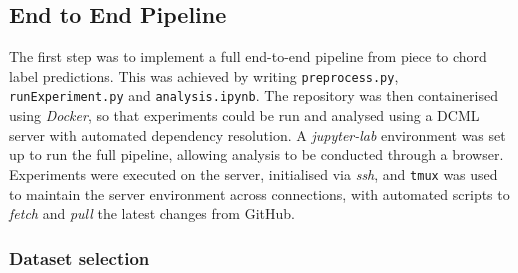 \documentclass[12pt,a4paper,twoside,openright]{report}
\DeclareMathOperator*{\argmax}{arg\,max}
\theoremstyle{definition}
\begin{document}
%
%
%
%
%
%


\subsection{End to End Pipeline}
The first step was to implement a full end-to-end pipeline from piece to chord label predictions.
This was achieved by writing \texttt{preprocess.py}, \texttt{runExperiment.py} and \texttt{analysis.ipynb}. The repository was then containerised using \textit{Docker}, so that experiments could be run and analysed using a DCML server with automated dependency resolution. A \textit{jupyter-lab} environment was set up to run the full pipeline, allowing analysis to be conducted through a browser. Experiments were executed on the server, initialised via \textit{ssh}, and \texttt{tmux} was used to maintain the server environment across connections, with automated scripts to \textit{fetch} and \textit{pull} the latest changes from GitHub.

\subsubsection{Dataset selection}
\end{document}
